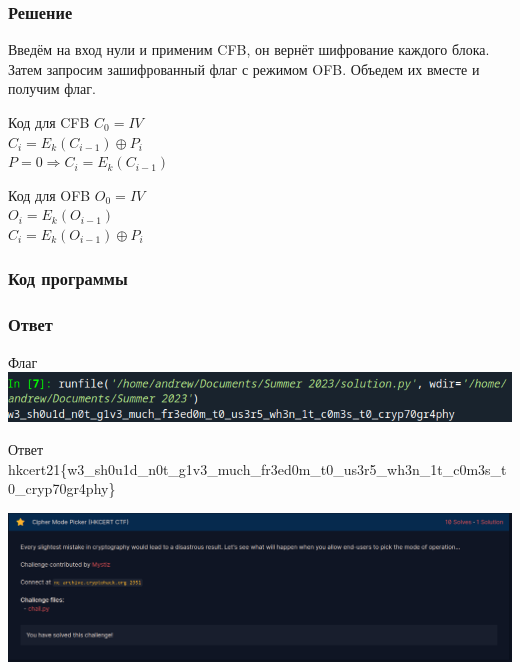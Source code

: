 \documentclass[10pt, typeface=serif(roman), pdf,hyperref={unicode}, aspectratio=169]{beamer}
\begin{document}
\begin{frame}
	\frametitle{Решение}
	Введём на вход нули и применим CFB, он вернёт шифрование каждого блока. Затем запросим зашифрованный флаг с режимом OFB. Объедем их вместе и получим флаг.
	\begin{block}
		{
			Код для CFB
		}
		\(C_0 = IV\)\\
		\(C_i = E_k(C_{i-1}) \oplus P_i\)\\
		\(P = 0 \Rightarrow C_i = E_k(C_{i-1})\)\\
	\end{block}
	\begin{block}
		{
			Код для OFB
		}
		\(O_0 = IV\)\\
		\(O_i = E_k(O_{i-1})\)\\
		\(C_i = E_k(O_{i-1}) \oplus P_i\)
	\end{block}
\end{frame}



\begin{frame}
	\frametitle{Код программы}
	
\end{frame}



\begin{frame}
	\frametitle{Ответ}
	\begin{block}
		{Флаг}
		\includegraphics[scale=0.935]{flag.png}
	\end{block}
	\begin{block}
		{Ответ}
		hkcert21\{w3\_sh0u1d\_n0t\_g1v3\_much\_fr3ed0m\_t0\_us3r5\_wh3n\_1t\_c0m3s\_t0\_cryp70gr4phy\}
	\end{block}
	\includegraphics[scale=0.45]{Решено.png}
\end{frame}
\end{document}

